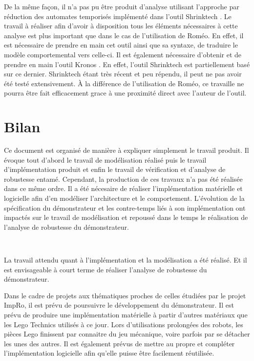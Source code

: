     De la même façon, il n'a pas pu être produit d'analyse utilisant l'approche
    par réduction des automates temporisés implémenté dans l'outil Shrinktech \cite{sankur13}.
    Le travail à réaliser afin d'avoir à disposition tous les éléments nécessaires à cette
    analyse est plus important que dans le cas de l'utilisation de Roméo.
    En effet, il est nécessaire de prendre en main cet outil ainsi que sa syntaxe,
    de traduire le modèle comportemental vers celle-ci. Il est également
    nécessaire d'obtenir et de prendre en main l'outil Kronos \cite{yovine97}.
    En effet, l'outil Shrinktech est partiellement basé sur ce dernier.
    Shrinktech étant très récent et peu répendu, il peut ne pas avoir
    été testé extensivement. À la différence de l'utilisation de Roméo, ce
    travaille ne pourra être fait efficacement grace à une proximité direct
    avec l'auteur de l'outil.

  \section{Bilan}

    Ce document est organisé de manière à expliquer simplement le
    travail produit. Il évoque tout d'abord le travail de modélisation réalisé puis le
    travail d'implémentation produit et enfin le travail de vérification et d'analyse
    de robustesse entamé. Cependant, la production de ces travaux n'a pas été réalisée dans ce même
    ordre. Il a été nécesaire de réaliser l'implémentation matérielle et
    logicielle afin d'en modéliser l'architecture et le comportement.
    L'évolution de la spécification du démonstrateur et les contre-temps liés
    à son implémentation ont impactés sur le travail de modélisation et
    repoussé dans le temps le réalisation de l'analyse de robustesse du
    démonstrateur.
    
    ~
    
    La travail attendu quant à l'implémentation et la modélisation a été
    réalisé. Et il est envisageable à court terme de réaliser l'analyse de
    robustesse du démonstrateur.
    
    Dans le cadre de projets aux thématiques proches de celles étudiées par le
    projet ImpRo, il est prévu de poursuivre le développement du démonstrateur.
    Il est prévu de produire une implémentation matérielle à partir d'autres
    matériaux que les Lego Technics utilisés à ce jour. Lors d'utilisations
    prolongées des robots, les pièces Lego finissent par connaitre du jeu mécanique, voire
    parfois par se détacher les unes des autres.
    Il est également prévus de mettre au propre et compléter l'implémentation 
    logicielle afin qu'elle puisse être facilement réutilisée.
    
